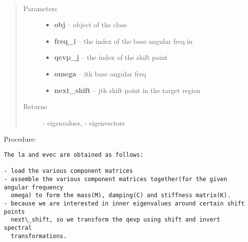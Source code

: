 \documentclass[letterpaper,10pt,english]{sphinxmanual}
\begin{document}
\begin{fulllineitems}
\label{index:brake.solve.qevp.Obtain_eigs}~\begin{quote}\begin{description}
\item[{Parameters}] \leavevmode\begin{itemize}
\item {} 
\textbf{obj} -- object of the class 

\item {} 
\textbf{freq\_i} -- the index of the base angular freq in

\item {} 
\textbf{qevp\_j} -- the index of the shift point

\item {} 
\textbf{omega} -- ith base angular freq

\item {} 
\textbf{next\_shift} -- jth shift point in the target region

\end{itemize}

\item[{Returns}] \leavevmode
{} - eigenvalues,  - eigenvectors

\end{description}\end{quote}

Procedure:

\begin{Verbatim}[commandchars=\\\{\}]
The la and evec are obtained as follows:
  
- load the various component matrices
- assemble the various component matrices together(for the given angular frequency
  omega) to form the mass(M), damping(C) and stiffness matrix(K).
- because we are interested in inner eigenvalues around certain shift points
  next\_shift, so we transform the qevp using shift and invert spectral
  transformations.
\end{Verbatim}

\end{fulllineitems}

\end{document}
